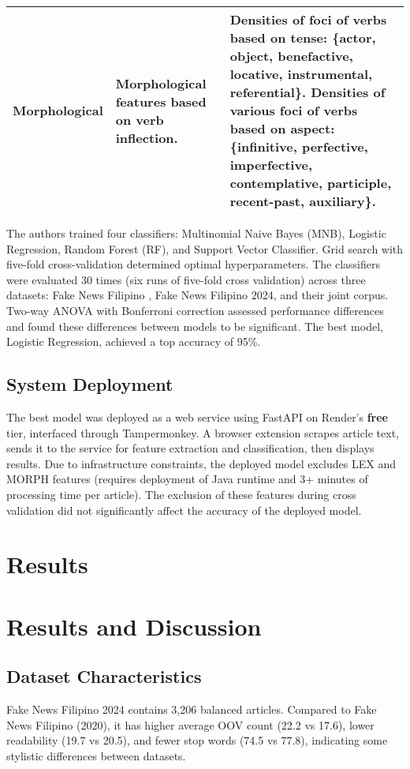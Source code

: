 \documentclass[conference]{IEEEtran}
\begin{document}
\begin{table*}[!t]
\begin{tabular}{|p{}|p{}|p{}|}
Morphological & Morphological features based on verb inflection. & Densities of foci of verbs based on tense: \{actor, object, benefactive, locative, instrumental, referential\}. Densities of various foci of verbs based on aspect: \{infinitive, perfective, imperfective, contemplative, participle, recent-past, auxiliary\}. \\ \hline

\end{tabular}
\end{table*}

The authors trained four classifiers: Multinomial Naive Bayes (MNB), Logistic Regression, Random Forest (RF), and Support Vector Classifier. Grid search with five-fold cross-validation determined optimal hyperparameters. The classifiers were evaluated 30 times (six runs of five-fold cross validation) across three datasets: Fake News Filipino \cite{b3}, Fake News Filipino 2024, and their joint corpus. Two-way ANOVA with Bonferroni correction assessed performance differences and found these differences between models to be significant. The best model, Logistic Regression, achieved a top accuracy of 95\%.

\subsection{System Deployment}
The best model was deployed as a web service using FastAPI on Render's \textbf{free} tier, interfaced through Tampermonkey. A browser extension scrapes article text, sends it to the service for feature extraction and classification, then displays results. Due to infrastructure constraints, the deployed model excludes LEX and MORPH features (requires deployment of Java runtime and 3+ minutes of processing time per article). The exclusion of these features during cross validation did not significantly affect the accuracy of the deployed model.

\section{Results}

\section{Results and Discussion}

\subsection{Dataset Characteristics}
Fake News Filipino 2024 contains 3,206 balanced articles. Compared to Fake News Filipino (2020), it has higher average OOV count (22.2 vs 17.6), lower readability (19.7 vs 20.5), and fewer stop words (74.5 vs 77.8), indicating some stylistic differences between datasets.
\end{document}
